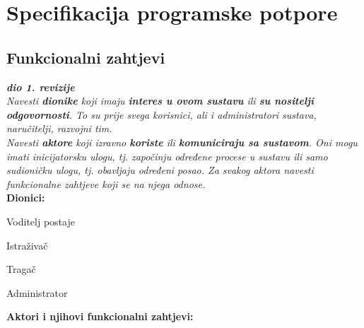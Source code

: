 \chapter{Specifikacija programske potpore}
		
	\section{Funkcionalni zahtjevi}
			
			\textbf{\textit{dio 1. revizije}}\\
			
			\textit{Navesti \textbf{dionike} koji imaju \textbf{interes u ovom sustavu} ili  \textbf{su nositelji odgovornosti}. To su prije svega korisnici, ali i administratori sustava, naručitelji, razvojni tim.}\\
				
			\textit{Navesti \textbf{aktore} koji izravno \textbf{koriste} ili \textbf{komuniciraju sa sustavom}. Oni mogu imati inicijatorsku ulogu, tj. započinju određene procese u sustavu ili samo sudioničku ulogu, tj. obavljaju određeni posao. Za svakog aktora navesti funkcionalne zahtjeve koji se na njega odnose.}\\
			
			
			\noindent \textbf{Dionici:}
			
			\begin{packed_enum}
				
				\item Voditelj postaje
				\item Istraživač	
				\item Tragač
				\item Administrator
				
			\end{packed_enum}
			
			\noindent \textbf{Aktori i njihovi funkcionalni zahtjevi:}
			
